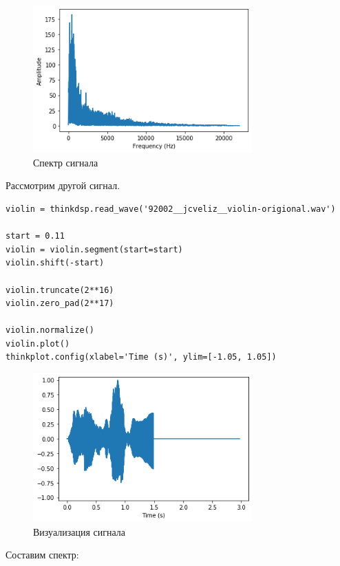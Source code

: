 \documentclass[a4paper,12pt]{report}
\begin{document}
\begin{figure}[H]
        \centering
        \includegraphics[width=0.75\textwidth]{lab10_fig1_2.png}
        \caption{Спектр сигнала}
        \label{fig:lab10_fig1_2}
\end{figure}

Рассмотрим другой сигнал.

\begin{lstlisting}[caption=Усечение сигнала]
violin = thinkdsp.read_wave('92002__jcveliz__violin-origional.wav')

start = 0.11
violin = violin.segment(start=start)
violin.shift(-start)

violin.truncate(2**16)
violin.zero_pad(2**17)

violin.normalize()
violin.plot()
thinkplot.config(xlabel='Time (s)', ylim=[-1.05, 1.05])
\end{lstlisting}

\begin{figure}[H]
        \centering
        \includegraphics[width=0.75\textwidth]{lab10_fig1_3.png}
        \caption{Визуализация сигнала}
        \label{fig:lab10_fig1_3}
\end{figure}

Составим спектр:
\end{document}
